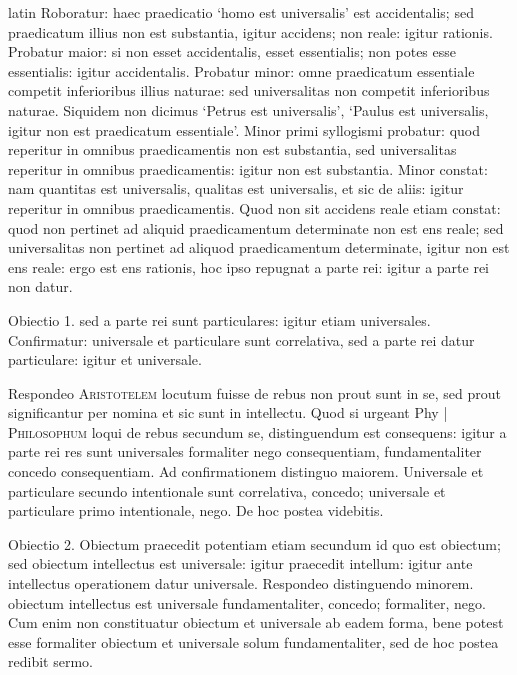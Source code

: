 \begin{otherlanguage*}{latin}
\pstart
Roboratur:
haec praedicatio `homo est universalis' est accidentalis; sed praedicatum illius non est substantia, igitur accidens; non reale:
igitur rationis. Probatur maior:
si non esset accidentalis, esset essentialis; non potes esse essentialis:
igitur accidentalis. Probatur minor:
omne praedicatum essentiale competit inferioribus illius naturae:
sed universalitas non competit inferioribus naturae. Siquidem non dicimus `Petrus est universalis', `Paulus est universalis, igitur non est praedicatum essentiale'. Minor primi syllogismi probatur:
quod reperitur in omnibus praedicamentis non est substantia, sed universalitas reperitur in omnibus praedicamentis:
igitur non est substantia. Minor constat:
nam quantitas est universalis, qualitas est universalis, et sic de aliis:
igitur reperitur in omnibus praedicamentis. Quod non sit accidens  reale etiam constat:
quod non pertinet ad aliquid praedicamentum determinate non est ens reale; sed universalitas non pertinet ad aliquod praedicamentum determinate, igitur non est ens reale:
ergo est ens rationis, hoc ipso repugnat a parte rei:
igitur a parte rei non datur. 
\pend

\pstart
Obiectio 1.  sed a parte rei sunt particulares:
igitur etiam universales. Confirmatur:
universale et particulare sunt correlativa, sed a parte rei datur particulare:
igitur et universale. 
\pend

\pstart
Respondeo \textsc{Aristotelem} locutum fuisse de rebus non prout sunt in se, sed prout significantur per nomina et sic sunt in intellectu. Quod si urgeant Phy \textnormal{|} \textsc{Philosophum} loqui de rebus secundum se, distinguendum est consequens:
igitur a parte rei res sunt universales formaliter nego consequentiam, fundamentaliter concedo consequentiam. Ad confirmationem distinguo maiorem. Universale et particulare secundo intentionale sunt correlativa, concedo; universale et particulare primo intentionale, nego. De hoc postea videbitis. 
\pend

\pstart
Obiectio 2. Obiectum praecedit potentiam etiam secundum id quo est obiectum; sed obiectum intellectus est universale:
igitur praecedit intellum:
igitur ante intellectus operationem datur universale. Respondeo distinguendo minorem. obiectum intellectus est universale fundamentaliter, concedo; formaliter, nego. Cum enim non constituatur obiectum et universale ab eadem forma, bene potest esse formaliter obiectum et universale solum fundamentaliter, sed de hoc postea redibit sermo. 
\pend


\end{otherlanguage*}

